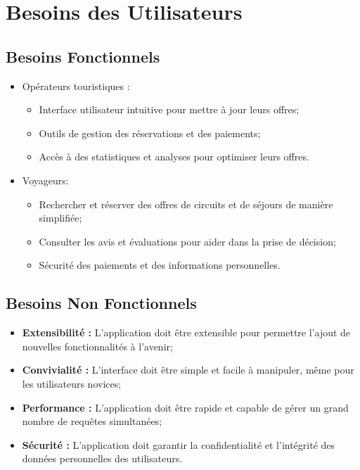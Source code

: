 \documentclass[12pt]{report}
\begin{document}
				\section{Besoins des Utilisateurs}
				\begin{center}
					\begin{minipage}{\textwidth}
						\subsection{Besoins Fonctionnels}
						\begin{itemize}
							\item Opérateurs touristiques :
								\begin{itemize}
									\item Interface utilisateur intuitive pour mettre à jour leurs offres;
									\item Outils de gestion des réservations et des paiements;
									\item Accès à des statistiques et analyses pour optimiser leurs offres.
								\end{itemize}		
							\item Voyageurs:
								\begin{itemize}
									\item Rechercher et réserver des offres de circuits et de séjours de manière simplifiée;
									\item Consulter les avis et évaluations pour aider dans la prise de décision;
									\item Sécurité des paiements et des informations personnelles.
								\end{itemize}
						\end{itemize}
					\end{minipage}
				\end{center}

				\begin{center}
					\begin{minipage}{\textwidth}
						\subsection{Besoins Non Fonctionnels}
						\begin{itemize}
							\item \textbf{Extensibilité :}  L'application doit être extensible pour permettre l'ajout de nouvelles fonctionnalités à l'avenir;
							\item \textbf{Convivialité :} L'interface doit être simple et facile à manipuler, même pour les utilisateurs novices;
							\item \textbf{Performance :} L'application doit être rapide et capable de gérer un grand nombre de requêtes simultanées;
							\item \textbf{Sécurité :} L'application doit garantir la confidentialité et l'intégrité des données personnelles des utilisateurs.
						\end{itemize}
					\end{minipage}
				\end{center}
								
\end{document}
